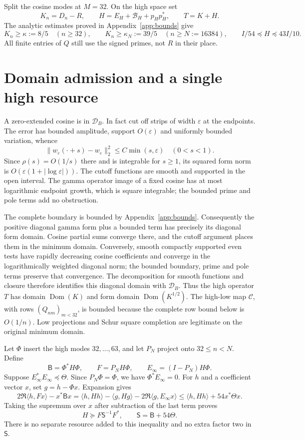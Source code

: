 \documentclass[11pt]{article}
\newcommand{\norm}[1]{\lVert#1\rVert}
\newcommand{\ip}[2]{\langle#1,#2\rangle}
\begin{document}
Split the cosine modes at $M=32$. On the high space set
\[
 K_n=D_n-R,\qquad H=E_H+\mathcal B_H+p_Hp_H^*,\qquad T=K+H.
\]
The analytic estimates proved in Appendix~\ref{app:bounds} give
\begin{equation}
 K_n\ge\kappa:=8/5\quad(n\ge32),\qquad
 K_n\ge\kappa_N:=39/5\quad(n\ge N:=16384),\qquad
 I/54\preceq H\preceq43I/10.\label{eq:floors}
\end{equation}
All finite entries of $Q$ still use the signed primes, not $R$ in their place.

\section{Domain admission and a single high resource}
A zero-extended cosine is in $\mathcal D_B$. In fact cut off strips of width $\varepsilon$ at the endpoints. The error has bounded amplitude, support $O(\varepsilon)$ and uniformly bounded variation, whence
\[
 \norm{w_\varepsilon(\cdot+s)-w_\varepsilon}_2^2
 \le C\min(s,\varepsilon)\quad(0<s<1).
\]
Since $\rho(s)=O(1/s)$ there and is integrable for $s\ge1$, its squared form norm is $O(\varepsilon(1+|\log\varepsilon|))$. The cutoff functions are smooth and supported in the open interval. The gamma operator image of a fixed cosine has at most logarithmic endpoint growth, which is square integrable; the bounded prime and pole terms add no obstruction.

The complete boundary is bounded by Appendix~\ref{app:bounds}. Consequently the positive diagonal gamma form plus a bounded term has precisely its diagonal form domain. Cosine partial sums converge there, and the cutoff argument places them in the minimum domain. Conversely, smooth compactly supported even tests have rapidly decreasing cosine coefficients and converge in the logarithmically weighted diagonal norm; the bounded boundary, prime and pole terms preserve that convergence. The decomposition for smooth functions and closure therefore identifies this diagonal domain with $\mathcal D_B$. Thus the high operator $T$ has domain $\operatorname{Dom}(K)$ and form domain $\operatorname{Dom}(K^{1/2})$. The high-low map $\mathcal C$, with rows $(Q_{nm})_{m<32}$, is bounded because the complete row bound below is $O(1/n)$. Low projections and Schur square completion are legitimate on the original minimum domain.

Let $\Phi$ insert the high modes $32,\ldots,63$, and let $P_N$ project onto $32\le n<N$. Define
\[
 \mathsf B=\Phi^*H\Phi,\qquad F=P_NH\Phi,\qquad
 E_\infty=(I-P_N)H\Phi.
\]
Suppose $E_\infty^*E_\infty\preceq\Theta$. Since $P_N\Phi=\Phi$, we have $\Phi^*E_\infty=0$. For $h$ and a coefficient vector $x$, set $g=h-\Phi x$. Expansion gives
\[
 2\Re\ip h{Fx}-x^*\mathsf Bx
 =\ip h{Hh}-\ip g{Hg}-2\Re\ip g{E_\infty x}
 \le\ip h{Hh}+54x^*\Theta x.
\]
Taking the supremum over $x$ after subtraction of the last term proves
\begin{equation}
 H\succeq F\mathsf S^{-1}F^*,\qquad \mathsf S=\mathsf B+54\Theta.\label{eq:single}
\end{equation}
There is no separate resource added to this inequality and no extra factor two in $\mathsf S$.
\end{document}
